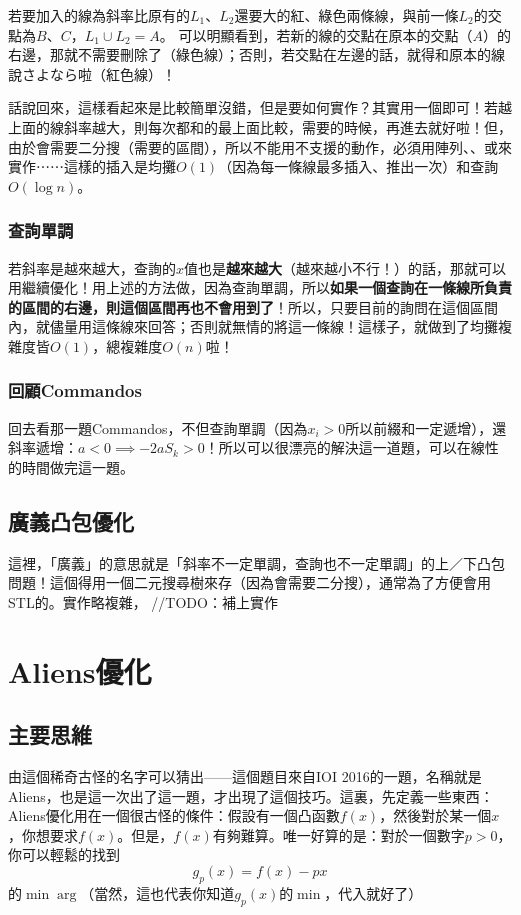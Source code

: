 			\begin{center}
			\end{center}
			若要加入的線為斜率比原有的$L_1$、$L_2$還要大的紅、綠色兩條線，與前一條$L_2$的交點為$B$、$C$，$L_1 \cup L_2 = A$。 可以明顯看到，若新的線的交點在原本的交點（$A$）的右邊，那就不需要刪除了（綠色線）；否則，若交點在左邊的話，就得和原本的線說さよなら啦（紅色線）！
			
			話說回來，這樣看起來是比較簡單沒錯，但是要如何實作？其實用一個即可！若越上面的線斜率越大，則每次都和的最上面比較，需要的時候，再進去就好啦！但，由於會需要二分搜（需要的區間），所以不能用不支援的動作，必須用陣列、、或來實作⋯⋯這樣的插入是均攤$O(1)$（因為每一條線最多插入、推出一次）和查詢$O(\log n)$。
		\subsubsection{查詢單調}
			若斜率是越來越大，查詢的$x$值也是\textbf{越來越大}（越來越小不行！）的話，那就可以用繼續優化！用上述的方法做，因為查詢單調，所以\textbf{如果一個查詢在一條線所負責的區間的右邊，則這個區間再也不會用到了}！所以，只要目前的詢問在這個區間內，就儘量用這條線來回答；否則就無情的將這一條線！這樣子，就做到了均攤複雜度皆$O(1)$，總複雜度$O(n)$啦！
		\subsubsection{回顧Commandos}
			回去看那一題Commandos，不但查詢單調（因為$x_i > 0$所以前綴和一定遞增），還斜率遞增：$a < 0 \implies -2aS_{k} > 0$！所以可以很漂亮的解決這一道題，可以在線性的時間做完這一題。
	\subsection{廣義凸包優化}
		這裡，「廣義」的意思就是「斜率不一定單調，查詢也不一定單調」的上／下凸包問題！這個得用一個二元搜尋樹來存（因為會需要二分搜），通常為了方便會用STL的。實作略複雜，
		//TODO：補上實作
\section{Aliens優化}
	\subsection{主要思維}
		由這個稀奇古怪的名字可以猜出——這個題目來自IOI 2016的一題，名稱就是Aliens，也是這一次出了這一題，才出現了這個技巧。這裏，先定義一些東西：
		Aliens優化用在一個很古怪的條件：假設有一個凸函數$f(x)$，然後對於某一個$x$，你想要求$f(x)$。但是，$f(x)$有夠難算。唯一好算的是：對於一個數字$p > 0$，你可以輕鬆的找到
		$$g_p(x) = f(x) - px$$
		的$\min\arg$（當然，這也代表你知道$g_p(x)$的$\min$，代入就好了）
		
